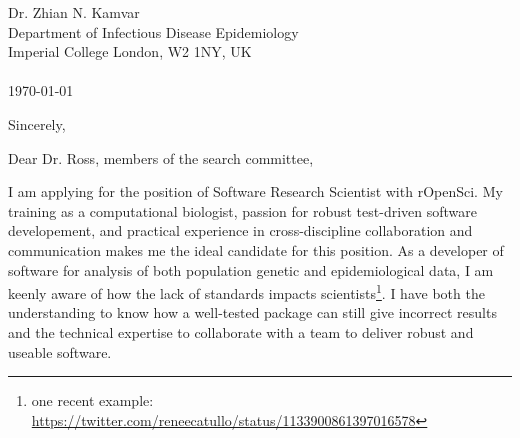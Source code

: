 


\clearpage
\begin{flushright}
  Dr. Zhian N. Kamvar\\
  Department of Infectious Disease Epidemiology\\
  Imperial College London, W2 1NY, UK\\
  \phantom{menace}\\
  \today
\end{flushright}
\closing{Sincerely,} %

Dear Dr. Ross, members of the search committee,\\
\phantom{tollbooth}

I am applying for the position of Software Research Scientist with rOpenSci. My
training as a computational biologist, passion for robust test-driven software
developement, and practical experience in cross-discipline collaboration and
communication  makes me the ideal candidate for this position. As a developer
of software for analysis of both population genetic and epidemiological data, I
am keenly aware of how the lack of standards impacts scientists\footnote{one
recent example:
\url{https://twitter.com/reneecatullo/status/1133900861397016578}}. I have both
the understanding to know how a well-tested package can still give incorrect
results and the technical expertise to collaborate with a team to deliver
robust and useable software. 


